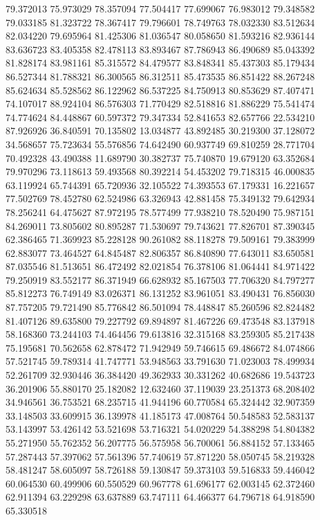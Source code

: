 79.372013
75.973029
78.357094
77.504417
77.699067
76.983012
79.348582
79.033185
81.323722
78.367417
79.796601
78.749763
78.032330
83.512634
82.034220
79.695964
81.425306
81.036547
80.058650
81.593216
82.936144
83.636723
83.405358
82.478113
83.893467
87.786943
86.490689
85.043392
81.828174
83.981161
85.315572
84.479577
83.848341
85.437303
85.179434
86.527344
81.788321
86.300565
86.312511
85.473535
86.851422
88.267248
85.624634
85.528562
86.122962
86.537225
84.750913
80.853629
87.407471
74.107017
88.924104
86.576303
71.770429
82.518816
81.886229
75.541474
74.774624
84.448867
60.597372
79.347334
52.841653
82.657766
22.534210
87.926926
36.840591
70.135802
13.034877
43.892485
30.219300
37.128072
34.568657
75.723634
55.576856
74.642490
60.937749
69.810259
28.771704
70.492328
43.490388
11.689790
30.382737
75.740870
19.679120
63.352684
79.970296
73.118613
59.493568
80.392214
54.453202
79.718315
46.000835
63.119924
65.744391
65.720936
32.105522
74.393553
67.179331
16.221657
77.502769
78.452780
62.524986
63.326943
42.881458
75.349132
79.642934
78.256241
64.475627
87.972195
78.577499
77.938210
78.520490
75.987151
84.269011
73.805602
80.895287
71.530697
79.743621
77.826701
87.390345
62.386465
71.369923
85.228128
90.261082
88.118278
79.509161
79.383999
62.883077
73.464527
64.845487
82.806357
86.840890
77.643011
83.650581
87.035546
81.513651
86.472492
82.021854
76.378106
81.064441
84.971422
79.250919
83.552177
86.371949
66.628932
85.167503
77.706320
84.797277
85.812273
76.749149
83.026371
86.131252
83.961051
83.490431
76.856030
87.757205
79.721490
85.776842
86.501094
78.448847
85.260596
82.824482
81.407126
89.635800
79.227792
69.894897
81.467226
69.473548
83.137918
58.168360
73.244103
74.464456
79.613816
32.315168
83.259305
85.217438
75.195681
70.562658
62.878472
71.942949
59.746615
69.486672
84.074866
57.521745
59.789314
41.747771
53.948563
33.791630
71.023003
78.499934
52.261709
32.930446
36.384420
49.362933
30.331262
40.682686
19.543723
36.201906
55.880170
25.182082
12.632460
37.119039
23.251373
68.208402
34.946561
36.753521
68.235715
41.944196
60.770584
65.324442
32.907359
33.148503
33.609915
36.139978
41.185173
47.008764
50.548583
52.583137
53.143997
53.426142
53.521698
53.716321
54.020229
54.388298
54.804382
55.271950
55.762352
56.207775
56.575958
56.700061
56.884152
57.133465
57.287443
57.397062
57.561396
57.740619
57.871220
58.050745
58.219328
58.481247
58.605097
58.726188
59.130847
59.373103
59.516833
59.446042
60.064530
60.499906
60.550529
60.967778
61.696177
62.003145
62.372460
62.911394
63.229298
63.637889
63.747111
64.466377
64.796718
64.918590
65.330518
